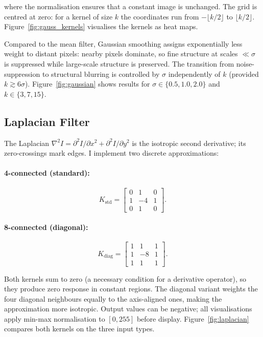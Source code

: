 \documentclass{article}
\begin{document}
where the normalisation ensures that a constant image is unchanged.
The grid is centred at zero: for a kernel of size $k$ the coordinates run from
$-\lfloor k/2 \rfloor$ to $\lfloor k/2 \rfloor$.
Figure~\ref{fig:gauss_kernels} visualises the kernels as heat maps.

Compared to the mean filter, Gaussian smoothing assigns exponentially less
weight to distant pixels: nearby pixels dominate, so fine structure at scales
$\ll \sigma$ is suppressed while large-scale structure is preserved.
The transition from noise-suppression to structural blurring is controlled by
$\sigma$ independently of $k$ (provided $k \gtrsim 6\sigma$).
Figure~\ref{fig:gaussian} shows results for $\sigma \in \{0.5, 1.0, 2.0\}$
and $k \in \{3, 7, 15\}$.

\subsection{Laplacian Filter}

The Laplacian $\nabla^2 I = \partial^2 I/\partial x^2 + \partial^2 I/\partial y^2$
is the isotropic second derivative; its zero-crossings mark edges.
I implement two discrete approximations:

\paragraph{4-connected (standard):}
\begin{equation}
  K_{\text{std}} =
  \begin{bmatrix} 0 & 1 & 0 \\ 1 & -4 & 1 \\ 0 & 1 & 0 \end{bmatrix}.
\end{equation}

\paragraph{8-connected (diagonal):}
\begin{equation}
  K_{\text{diag}} =
  \begin{bmatrix} 1 & 1 & 1 \\ 1 & -8 & 1 \\ 1 & 1 & 1 \end{bmatrix}.
\end{equation}

Both kernels sum to zero (a necessary condition for a derivative operator),
so they produce zero response in constant regions.
The diagonal variant weights the four diagonal neighbours equally to the
axis-aligned ones, making the approximation more isotropic.
Output values can be negative; all visualisations apply min-max normalisation
to $[0,255]$ before display.
Figure~\ref{fig:laplacian} compares both kernels on the three input types.
\end{document}
